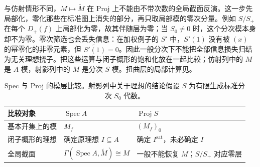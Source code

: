 \ProseParagraphBreak
与仿射情形不同，\(M\mapsto\widetilde M\) 在 Proj 上不能由不带次数的全局截面反演。这一步先局部化，零化那些在标准图上消失的部分，再只取局部模的零次分量。例如 \(S/S_+\) 在每个 \(D_+(f)\) 上局部化为零，故其伴随层为零；当 \(S_0\ne0\) 时，这个分次模本身却不为零。零次筛选也会丢失信息：在加权例子的 \(S'\) 中，\(S'(1)\) 没有被 \((x)\) 的幂零化的非零元素，但 \(\widetilde{S'(1)}=0\)。因此一般分次下不能把全部信息损失归结为无关理想挠子。把这些运算与闭子概形的饱和化放在一起比较；仿射列中的 \(M\) 是 \(A\) 模，射影列中的 \(M\) 是分次 \(S\) 模。扭曲层的局部计算见\cite[Chapter II, Propositions 5.11--5.12, pp. 116--117]{Hartshorne1977}。

\begin{table}[htbp]
	\centering
	\caption[Spec 与 Proj 的模层比较]{Spec 与 Proj 的模层比较。射影列中关于理想的结论假设 \(S\) 为有限生成标准分次 \(S_0\) 代数。}
	\label{b3:tab:spec-proj-sheaf-comparison}
	\begin{tabularx}{\linewidth}{@{}lXX@{}}
		\toprule
		比较对象 & \(\operatorname{Spec}A\) & \(\operatorname{Proj}S\) \\
		\midrule
		基本开集上的模 & \(M_f\) & \((M_f)_0\) \\
		闭子概形的理想 & 确定原理想 \(I\subseteq A\) & 确定 \(I^{\mathrm{sat}}\)，未必确定 \(I\) \\
		全局截面 & \(\Gamma(\operatorname{Spec}A,\widetilde M)\cong M\) & 一般不能恢复 \(M\)；\(S/S_+\) 对应零层 \\
		\bottomrule
	\end{tabularx}
\end{table}
